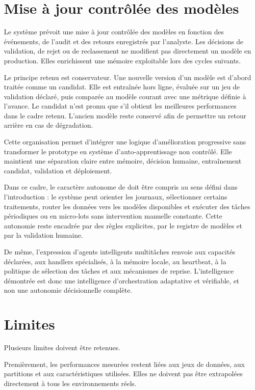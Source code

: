 \section{Mise à jour contrôlée des modèles}

Le système prévoit une mise à jour contrôlée des modèles en fonction des événements, de l'audit et des retours enregistrés par l'analyste. Les décisions de validation, de rejet ou de reclassement ne modifient pas directement un modèle en production. Elles enrichissent une mémoire exploitable lors des cycles suivants.

Le principe retenu est conservateur. Une nouvelle version d'un modèle est d'abord traitée comme un candidat. Elle est entraînée hors ligne, évaluée sur un jeu de validation déclaré, puis comparée au modèle courant avec une métrique définie à l'avance. Le candidat n'est promu que s'il obtient les meilleures performances dans le cadre retenu. L'ancien modèle reste conservé afin de permettre un retour arrière en cas de dégradation.

Cette organisation permet d'intégrer une logique d'amélioration progressive sans transformer le prototype en système d'auto-apprentissage non contrôlé. Elle maintient une séparation claire entre mémoire, décision humaine, entraînement candidat, validation et déploiement.

Dans ce cadre, le caractère autonome de \logminer{} doit être compris au sens défini dans l'introduction : le système peut orienter les journaux, sélectionner certains traitements, router les données vers les modèles disponibles et exécuter des tâches périodiques ou en micro-lots sans intervention manuelle constante. Cette autonomie reste encadrée par des règles explicites, par le registre de modèles et par la validation humaine.

De même, l'expression d'agents intelligents multitâches renvoie aux capacités déclarées, aux handlers spécialisés, à la mémoire locale, au heartbeat, à la politique de sélection des tâches et aux mécanismes de reprise. L'intelligence démontrée est donc une intelligence d'orchestration adaptative et vérifiable, et non une autonomie décisionnelle complète.

\section{Limites}

Plusieurs limites doivent être retenues.

Premièrement, les performances mesurées restent liées aux jeux de données, aux partitions et aux caractéristiques utilisées. Elles ne doivent pas être extrapolées directement à tous les environnements réels.

